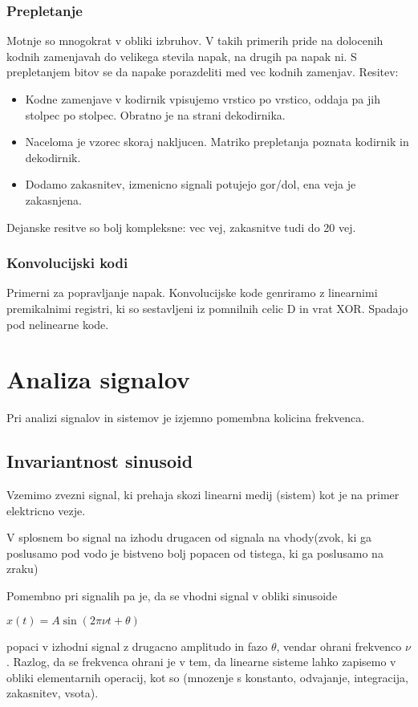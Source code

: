 \documentclass{article}
\begin{document}
\begin{multicols}{3}
\subsubsection{Prepletanje}
Motnje so mnogokrat v obliki izbruhov. V takih primerih pride na dolocenih kodnih zamenjavah do velikega stevila napak, na drugih pa napak ni.
S prepletanjem bitov se da napake porazdeliti med vec kodnih zamenjav.
Resitev:
\begin{itemize}
    \item Kodne zamenjave v kodirnik vpisujemo vrstico po vrstico, oddaja pa jih stolpec po stolpec. Obratno je na strani dekodirnika.
    \item Naceloma je vzorec skoraj nakljucen. Matriko prepletanja poznata kodirnik in dekodirnik.
    \item Dodamo zakasnitev, izmenicno signali potujejo gor/dol, ena veja je zakasnjena.
\end{itemize}
Dejanske resitve so bolj kompleksne: vec vej, zakasnitve tudi do 20 vej.

\subsubsection{Konvolucijski kodi}
Primerni za popravljanje napak. Konvolucijske kode genriramo z linearnimi premikalnimi registri, ki so sestavljeni iz 
pomnilnih celic D in vrat XOR. Spadajo pod nelinearne kode.

\section{Analiza signalov}
Pri analizi signalov in sistemov je izjemno pomembna kolicina frekvenca.

\subsection{Invariantnost sinusoid}
Vzemimo zvezni signal, ki prehaja skozi linearni medij (sistem) kot je na primer elektricno vezje.

V splosnem bo signal na izhodu drugacen od signala na vhody(zvok, ki ga poslusamo pod vodo je bistveno bolj popacen od tistega,
ki ga poslusamo na zraku)

Pomembno pri signalih pa je, da se vhodni signal v obliki sinusoide
\begin{center}
    \begin{math}
        x(t) = A \sin (2 \pi \nu t + \theta)
    \end{math}
\end{center}
popaci v izhodni signal z drugacno amplitudo in fazo $\theta$, vendar ohrani frekvenco $\nu$. Razlog, da se frekvenca
ohrani je v tem, da linearne sisteme lahko zapisemo v obliki elementarnih operacij, kot so (mnozenje s konstanto, odvajanje,
integracija, zakasnitev, vsota).


\end{multicols}
\end{document}
